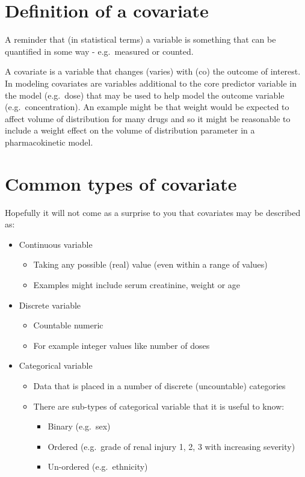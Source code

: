 \documentclass[
]{article}
\providecommand{\tightlist}{%
  \setlength{\itemsep}{0pt}\setlength{\parskip}{0pt}}
\begin{document}
\section{Definition of a covariate}\label{definition-of-a-covariate}

A reminder that (in statistical terms) a variable is something that can be quantified in some way - e.g.~measured or counted.

A covariate is a variable that changes (varies) with (co) the outcome of interest. In modeling covariates are variables additional to the core predictor variable in the model (e.g.~dose) that may be used to help model the outcome variable (e.g.~concentration). An example might be that weight would be expected to affect volume of distribution for many drugs and so it might be reasonable to include a weight effect on the volume of distribution parameter in a pharmacokinetic model.

\section{Common types of covariate}\label{common-types-of-covariate}

Hopefully it will not come as a surprise to you that covariates may be described as:

\begin{itemize}
\tightlist
\item
  Continuous variable

  \begin{itemize}
  \tightlist
  \item
    Taking any possible (real) value (even within a range of values)
  \item
    Examples might include serum creatinine, weight or age
  \end{itemize}
\item
  Discrete variable

  \begin{itemize}
  \tightlist
  \item
    Countable numeric
  \item
    For example integer values like number of doses
  \end{itemize}
\item
  Categorical variable

  \begin{itemize}
  \tightlist
  \item
    Data that is placed in a number of discrete (uncountable) categories
  \item
    There are sub-types of categorical variable that it is useful to know:

    \begin{itemize}
    \tightlist
    \item
      Binary (e.g.~sex)
    \item
      Ordered (e.g.~grade of renal injury 1, 2, 3 with increasing severity)
    \item
      Un-ordered (e.g.~ethnicity)
    \end{itemize}
  \end{itemize}
\end{itemize}
\end{document}
